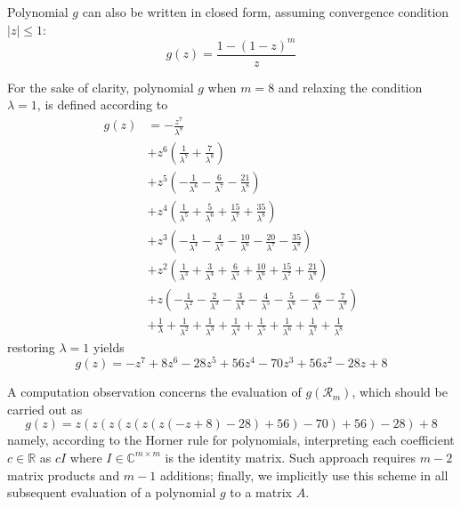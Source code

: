 Polynomial $g$ can also be written in closed form, assuming convergence condition $|z|\leq 1$:
\begin{displaymath}
g(z) = \frac{1- \left(1- z \right)^{m} }{z}
\end{displaymath}

For the sake of clarity, polynomial $g$ when $m=8$ and relaxing the condition $\lambda=1$, is defined according to 
\begin{displaymath}
\begin{split}
g{\left (z \right )} &= - \frac{z^{7}}{\lambda^{8}} \\
&+ z^{6} \left(\frac{1}{\lambda^{7}} + \frac{7}{\lambda^{8}}\right) \\
&+ z^{5} \left(- \frac{1}{\lambda^{6}} - \frac{6}{\lambda^{7}} - \frac{21}{\lambda^{8}}\right) \\
&+ z^{4} \left(\frac{1}{\lambda^{5}} + \frac{5}{\lambda^{6}} + \frac{15}{\lambda^{7}} + \frac{35}{\lambda^{8}}\right) \\
&+ z^{3} \left(- \frac{1}{\lambda^{4}} - \frac{4}{\lambda^{5}} - \frac{10}{\lambda^{6}} - \frac{20}{\lambda^{7}} - \frac{35}{\lambda^{8}}\right) \\
&+ z^{2} \left(\frac{1}{\lambda^{3}} + \frac{3}{\lambda^{4}} + \frac{6}{\lambda^{5}} + \frac{10}{\lambda^{6}} + \frac{15}{\lambda^{7}} + \frac{21}{\lambda^{8}}\right) \\
&+ z \left(- \frac{1}{\lambda^{2}} - \frac{2}{\lambda^{3}} - \frac{3}{\lambda^{4}} - \frac{4}{\lambda^{5}} - \frac{5}{\lambda^{6}} - \frac{6}{\lambda^{7}} - \frac{7}{\lambda^{8}}\right) \\
&+ \frac{1}{\lambda} + \frac{1}{\lambda^{2}} + \frac{1}{\lambda^{3}} + \frac{1}{\lambda^{4}} + \frac{1}{\lambda^{5}} + \frac{1}{\lambda^{6}} + \frac{1}{\lambda^{7}} + \frac{1}{\lambda^{8}}
\end{split}
\end{displaymath}
restoring $\lambda=1$ yields \[g{\left (z \right )} = - z^{7} + 8 z^{6} - 28 z^{5} + 56 z^{4} - 70 z^{3} + 56 z^{2} - 28 z + 8\]

A computation observation concerns the evaluation of $g(\mathcal{R}_{m})$, which should be carried out as
\begin{displaymath}
g(z) = z \left(z \left(z \left(z \left(z \left(z \left(- z + 8\right) - 28\right) + 56\right) - 70\right) + 56\right) - 28\right) + 8
\end{displaymath}
namely, according to the Horner rule for polynomials, interpreting each coefficient $c\in\mathbb{R}$ as $cI$ where $I\in\mathbb{C}^{m\times m}$ is the
identity matrix. Such approach requires $m-2$ matrix products and $m-1$ additions; finally, we implicitly use this scheme in all subsequent evaluation of a polynomial $g$ to a matrix $A$.



